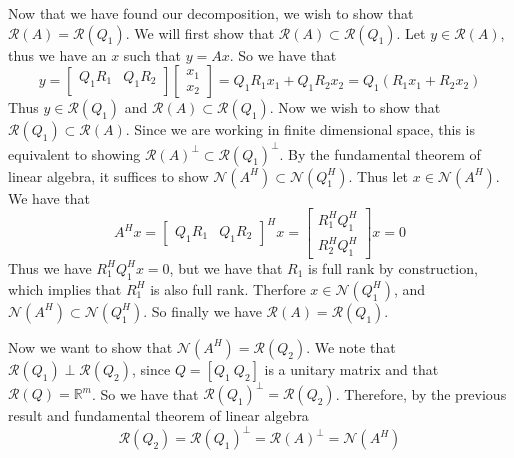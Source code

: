 \documentclass{exam}
\begin{document}
\begin{solution}
  Now that we have found our decomposition, we wish to show that $\mathcal{R}(A) = \mathcal{R}(Q_1)$. We will first show that $\mathcal{R}(A) \subset \mathcal{R}(Q_1)$. Let $y \in \mathcal{R}(A)$, thus we have an $x$ such that $y = Ax$. So we have that
      \[
         y = 
         \begin{bmatrix}
             Q_1R_1 & Q_1R_2 \\
         \end{bmatrix}
         \begin{bmatrix}
             x_1 \\
             x_2
         \end{bmatrix}
         = 
         Q_1R_1x_1 + Q_1R_2x_2 = Q_1(R_1x_1 + R_2x_2)
      \]
      Thus $y \in \mathcal{R}(Q_1)$ and $\mathcal{R}(A) \subset \mathcal{R}(Q_1)$. Now we wish to show that $\mathcal{R}(Q_1) \subset \mathcal{R}(A)$. Since we are working in finite dimensional space, this is equivalent to showing $\mathcal{R}(A)^{\perp} \subset \mathcal{R}(Q_1)^{\perp}$. By the fundamental theorem of linear algebra, it suffices to show $\mathcal{N}(A^H) \subset \mathcal{N}(Q_1^H)$. Thus let $x \in \mathcal{N}(A^H)$. We have that
      \[
          A^Hx = 
          \begin{bmatrix}
              Q_1R_1 & Q_1R_2
          \end{bmatrix}
          ^Hx
          = 
          \begin{bmatrix}
              R_1^HQ_1^H \\
              R_2^HQ_1^H
          \end{bmatrix}x
          =0
      \]
      Thus we have $R_1^HQ_1^Hx = 0$, but we have that $R_1$ is full rank by construction, which implies that $R_1^H$ is also full rank. Therfore $x \in \mathcal{N}(Q_1^H)$, and $\mathcal{N}(A^H) \subset \mathcal{N}(Q_1^H)$. So finally we have $\mathcal{R}(A) = \mathcal{R}(Q_1)$.

      Now we want to show that $\mathcal{N}(A^H) = \mathcal{R}(Q_2)$. We note that $\mathcal{R}(Q_1) \perp \mathcal{R}(Q_2)$, since $Q = \left[ Q_1 \ Q_2 \right]$ is a unitary matrix and that $\mathcal{R}(Q) = \mathds{R}^m$. So we have that $\mathcal{R}(Q_1)^{\perp} = \mathcal{R}(Q_2)$. Therefore, by the previous result and fundamental theorem of linear algebra
      \[
          \mathcal{R}(Q_2) = \mathcal{R}(Q_1)^{\perp} = \mathcal{R}(A)^{\perp} = \mathcal{N}(A^H)
      \]

  \end{solution}
\end{document}
